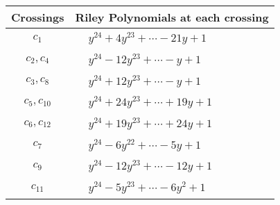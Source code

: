\documentclass[1p]{elsarticle_modified}
\theoremstyle{definition}
\begin{document}
\begin{tabular}{m{50pt}|m{274pt}}
Crossings & \hspace{64pt}Riley Polynomials at each crossing \\
\hline $$\begin{aligned}c_{1}\end{aligned}$$&$\begin{aligned}
&y^{24}+4 y^{23}+\cdots-21 y+1
\end{aligned}$\\
\hline $$\begin{aligned}c_{2},c_{4}\end{aligned}$$&$\begin{aligned}
&y^{24}-12 y^{23}+\cdots- y+1
\end{aligned}$\\
\hline $$\begin{aligned}c_{3},c_{8}\end{aligned}$$&$\begin{aligned}
&y^{24}+12 y^{23}+\cdots- y+1
\end{aligned}$\\
\hline $$\begin{aligned}c_{5},c_{10}\end{aligned}$$&$\begin{aligned}
&y^{24}+24 y^{23}+\cdots+19 y+1
\end{aligned}$\\
\hline $$\begin{aligned}c_{6},c_{12}\end{aligned}$$&$\begin{aligned}
&y^{24}+19 y^{23}+\cdots+24 y+1
\end{aligned}$\\
\hline $$\begin{aligned}c_{7}\end{aligned}$$&$\begin{aligned}
&y^{24}-6 y^{22}+\cdots-5 y+1
\end{aligned}$\\
\hline $$\begin{aligned}c_{9}\end{aligned}$$&$\begin{aligned}
&y^{24}-12 y^{23}+\cdots-12 y+1
\end{aligned}$\\
\hline $$\begin{aligned}c_{11}\end{aligned}$$&$\begin{aligned}
&y^{24}-5 y^{23}+\cdots-6 y^2+1
\end{aligned}$\\
\hline
\end{tabular}\\~\\
\end{document}
